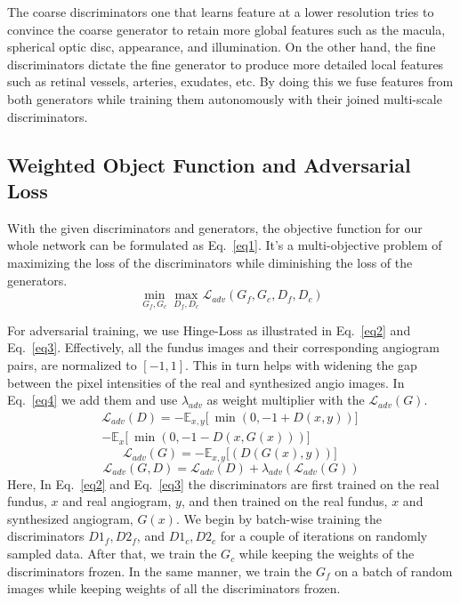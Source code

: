 \documentclass[a4paper,conference]{IEEEtran}
\begin{document}
The coarse discriminators one that learns feature at a lower resolution tries to convince the coarse generator to retain more global features such as the macula, spherical optic disc, appearance, and illumination. On the other hand,  the fine discriminators dictate the fine generator to produce more detailed local features such as retinal vessels, arteries, exudates,  etc. By doing this we fuse features from both generators while training them autonomously with their joined multi-scale discriminators.

\subsection{Weighted Object Function and Adversarial Loss}
\label{subsec:objective}

With the given discriminators and generators, the objective function for our whole network can be formulated as Eq.~\ref{eq1}. It's a multi-objective problem of maximizing the loss of the discriminators while diminishing the loss of the generators. 
\begin{equation}
    \min \limits_{G_{f},G_{c}} \max \limits_{D_{f},D_{c}}  \mathcal{L}_{adv}(G_{f},G_{c}, D_{f},D_{c})
    \label{eq1}
\end{equation} 

For adversarial training, we use Hinge-Loss \cite{zhang2019self,lim2017geometric} as illustrated in Eq.~\ref{eq2} and Eq.~\ref{eq3}. Effectively, all the fundus images and their corresponding angiogram pairs, are normalized to $[-1,1]$. This in turn helps with widening the gap between the pixel intensities of the real and synthesized angio images. In Eq.~\ref{eq4} we add them and use $\lambda_{adv}$ as weight multiplier with the $\mathcal{L}_{adv}(G)$.
\begin{multline}
    \mathcal{L}_{adv}(D) = - \mathbb{E}_{x,y} \big[\ \min(0,-1+D(x,y))\big]\ \\-  \mathbb{E}_{x} \big[\ \min(0,-1-D(x,G(x))) \big]\
    \label{eq2}
\end{multline}
\begin{equation}
    \mathcal{L}_{adv}(G) = - \mathbb{E}_{x,y} \big[(D(G(x),y))\big]\
    \label{eq3}
\end{equation}
\begin{equation}
    \mathcal{L}_{adv}(G,D) = \mathcal{L}_{adv}(D) + \lambda_{adv} (\mathcal{L}_{adv}(G)) 
    \label{eq4}
\end{equation}
Here, In Eq.~\ref{eq2} and Eq.~\ref{eq3} the discriminators are first trained on the real fundus, $x$ and real angiogram, $y$, and then trained on the real fundus, $x$ and synthesized angiogram, $G(x)$. We begin by batch-wise training the discriminators $D1_{f}, D2_{f}$, and $D1_{c},D2_{c}$ for a couple of iterations on randomly sampled data. After that, we train the $G_{c}$ while keeping the weights of the discriminators frozen. In the same manner, we train the $G_{f}$ on a batch of random images while keeping weights of all the discriminators frozen. 
\end{document}
